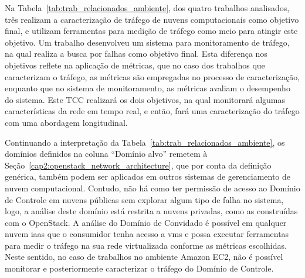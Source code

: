 Na Tabela~\ref{tab:trab_relacionados_ambiente}, dos quatro trabalhos analisados, três realizam a caracterização de tráfego de nuvens computacionais como objetivo final, e utilizam ferramentas para medição de tráfego como meio para atingir este objetivo.
%
Um trabalho desenvolveu um sistema para monitoramento de tráfego, na qual realiza a busca por falhas como objetivo final.
%
Esta diferença nos objetivos reflete na aplicação de métricas, que no caso dos trabalhos que caracterizam o tráfego, as métricas são empregadas no processo de caracterização, enquanto que no sistema de monitoramento, as métricas avaliam o desempenho do sistema.
%
Este TCC realizará os dois objetivos, na qual monitorará algumas características da rede em tempo real, e então, fará uma caracterização do tráfego com uma abordagem longitudinal.

Continuando a interpretação da Tabela~\ref{tab:trab_relacionados_ambiente}, os domínios definidos na coluna ``Domínio alvo'' remetem à Seção~\ref{cap2:openstack_network_architecture}, que por conta da definição genérica, também podem ser aplicados em outros sistemas de gerenciamento de nuvem computacional.
%
Contudo, não há como ter permissão de acesso ao Domínio de Controle em nuvens públicas sem explorar algum tipo de falha no sistema, logo, a análise deste domínio está restrita a nuvens privadas, como as construídas com o OpenStack.
%
A análise do Domínio de Convidado é possível em qualquer nuvem \ac{iaas} que o consumidor tenha acesso a \acp{vm} e possa executar ferramentas para medir o tráfego na sua rede virtualizada conforme as métricas escolhidas.
%
Neste sentido, no caso de trabalhos no ambiente Amazon EC2, não é possível monitorar e posteriormente caracterizar o tráfego do Domínio de Controle.
\pagebreak

